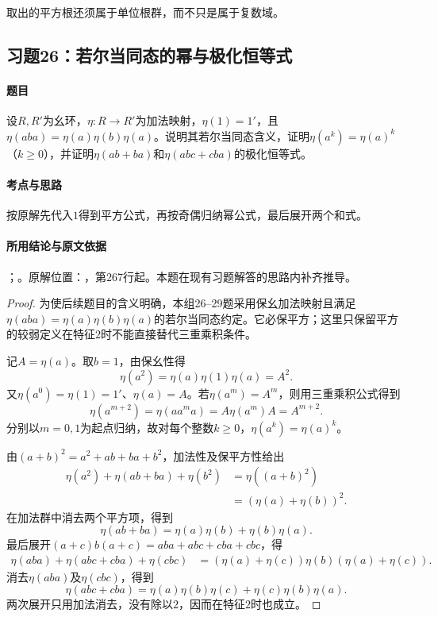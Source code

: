 取出的平方根还须属于单位根群，而不只是属于复数域。



\subsection{习题26：若尔当同态的幂与极化恒等式}

\label{ex:3:26}

\paragraph{题目}

设$R,R'$为幺环，$\eta:R\to R'$为加法映射，$\eta(1)=1'$，且$\eta(aba)=\eta(a)\eta(b)\eta(a)$。说明其若尔当同态含义，证明$\eta(a^k)=\eta(a)^k$（$k\ge0$），并证明$\eta(ab+ba)$和$\eta(abc+cba)$的极化恒等式。

\paragraph{考点与思路}

按原解先代入$1$得到平方公式，再按奇偶归纳幂公式，最后展开两个和式。

\paragraph{所用结论与原文依据}

；。原解位置：，第267行起。本题在现有习题解答的思路内补齐推导。


\begin{proof}

为使后续题目的含义明确，本组26--29题采用保幺加法映射且满足$\eta(aba)=\eta(a)\eta(b)\eta(a)$的若尔当同态约定。它必保平方；这里只保留平方的较弱定义在特征$2$时不能直接替代三重乘积条件。

记$A=\eta(a)$。取$b=1$，由保幺性得
\[
\eta(a^2)=\eta(a)\eta(1)\eta(a)=A^2.
\]
又$\eta(a^0)=\eta(1)=1'$、$\eta(a)=A$。若$\eta(a^m)=A^m$，则用三重乘积公式得到
\[
\eta(a^{m+2})=\eta(aa^ma)=A\eta(a^m)A=A^{m+2}.
\]
分别以$m=0,1$为起点归纳，故对每个整数$k\ge0$，$\eta(a^k)=\eta(a)^k$。

由$(a+b)^2=a^2+ab+ba+b^2$，加法性及保平方性给出
\begin{align*}
\eta(a^2)+\eta(ab+ba)+\eta(b^2)
&=\eta((a+b)^2)\\
&=(\eta(a)+\eta(b))^2.
\end{align*}
在加法群中消去两个平方项，得到
\[
\eta(ab+ba)=\eta(a)\eta(b)+\eta(b)\eta(a).
\]
最后展开$(a+c)b(a+c)=aba+abc+cba+cbc$，得
\begin{align*}
\eta(aba)+\eta(abc+cba)+\eta(cbc)
&=(\eta(a)+\eta(c))\eta(b)(\eta(a)+\eta(c)).
\end{align*}
消去$\eta(aba)$及$\eta(cbc)$，得到
\[
\eta(abc+cba)=\eta(a)\eta(b)\eta(c)+\eta(c)\eta(b)\eta(a).
\]
两次展开只用加法消去，没有除以$2$，因而在特征$2$时也成立。

\end{proof}

